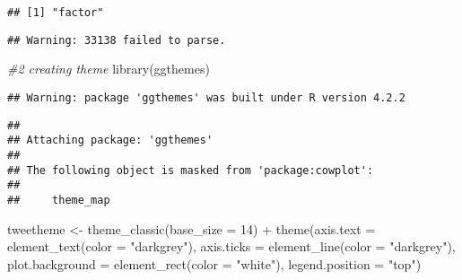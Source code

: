 \documentclass[
]{article}
\newenvironment{Shaded}{\begin{snugshade}}{\end{snugshade}}
\newcommand{\AttributeTok}[1]{\textcolor[rgb]{0.77,0.63,0.00}{#1}}
\newcommand{\CommentTok}[1]{\textcolor[rgb]{0.56,0.35,0.01}{\textit{#1}}}
\newcommand{\ConstantTok}[1]{\textcolor[rgb]{0.00,0.00,0.00}{#1}}
\newcommand{\DecValTok}[1]{\textcolor[rgb]{0.00,0.00,0.81}{#1}}
\newcommand{\FunctionTok}[1]{\textcolor[rgb]{0.00,0.00,0.00}{#1}}
\newcommand{\NormalTok}[1]{#1}
\newcommand{\OtherTok}[1]{\textcolor[rgb]{0.56,0.35,0.01}{#1}}
\newcommand{\SpecialCharTok}[1]{\textcolor[rgb]{0.00,0.00,0.00}{#1}}
\newcommand{\StringTok}[1]{\textcolor[rgb]{0.31,0.60,0.02}{#1}}
\begin{document}
\begin{Shaded}
\end{Shaded}

\begin{verbatim}
## [1] "factor"
\end{verbatim}

\begin{Shaded}
\end{Shaded}

\begin{verbatim}
## Warning: 33138 failed to parse.
\end{verbatim}

\begin{Shaded}
\begin{Highlighting}[]
\CommentTok{\#2 creating theme }
\FunctionTok{library}\NormalTok{(ggthemes)}
\end{Highlighting}
\end{Shaded}

\begin{verbatim}
## Warning: package 'ggthemes' was built under R version 4.2.2
\end{verbatim}

\begin{verbatim}
## 
## Attaching package: 'ggthemes'
## 
## The following object is masked from 'package:cowplot':
## 
##     theme_map
\end{verbatim}

\begin{Shaded}
\begin{Highlighting}[]
\NormalTok{tweetheme }\OtherTok{\textless{}{-}} \FunctionTok{theme\_classic}\NormalTok{(}\AttributeTok{base\_size =} \DecValTok{14}\NormalTok{) }\SpecialCharTok{+} 
  \FunctionTok{theme}\NormalTok{(}\AttributeTok{axis.text =} \FunctionTok{element\_text}\NormalTok{(}\AttributeTok{color =} \StringTok{"darkgrey"}\NormalTok{),}
        \AttributeTok{axis.ticks =} \FunctionTok{element\_line}\NormalTok{(}\AttributeTok{color =} \StringTok{"darkgrey"}\NormalTok{),}
        \AttributeTok{plot.background =} \FunctionTok{element\_rect}\NormalTok{(}\AttributeTok{color =} \StringTok{"white"}\NormalTok{),}
        \AttributeTok{legend.position =} \StringTok{"top"}\NormalTok{)}
\end{Highlighting}
\end{Shaded}
\end{document}
